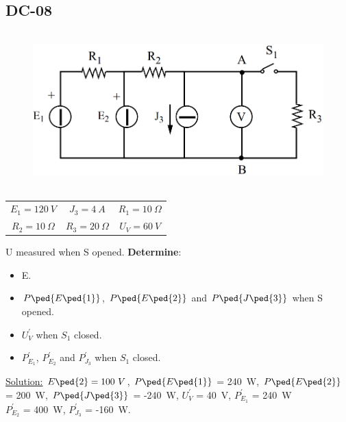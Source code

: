 \subsection{DC-08}
\begin{figure}[h]
\includegraphics[height=6cm]{img/1/08.png}
\centering
\end{figure}
\begin{center}
\begin{tabular}{ c c c }
  $E_1 = 120 \ V$ & $J_3 = 4\ A$ & $R_1 = 10 \ \Omega$\\
  $R_2 = 10 \ \Omega$ & $R_3 = 20 \ \Omega$ & $U_V = 60\ V$
\end{tabular}
\end{center}
\newpage
U measured when S opened. \textbf{Determine}:
\begin{itemize}
  \item E.
  \item $P\ped{E\ped{1}}$, $P\ped{E\ped{2}}$ and $P\ped{J\ped{3}}$ when S opened.
  \item $U^{'}_{V}$ when $S_1$ closed.
  \item $P^{'}_{E_1}$, $P^{'}_{E_2}$ and $P^{'}_{J_3}$ when $S_1$ closed.
\end{itemize}
\underline{\large{Solution:}}
\newline
$E\ped{2} = 100\ V$, $P\ped{E\ped{1}}$ = 240\ W, $P\ped{E\ped{2}}$ = 200\ W, $P\ped{J\ped{3}}$ = -240\ W, $U^{'}_{V}$ = 40\ V, $P^{'}_{E_1}$ = 240\ W\\ $P^{'}_{E_2}$ = 400\ W, $P^{'}_{J_3}$ = -160\ W.
